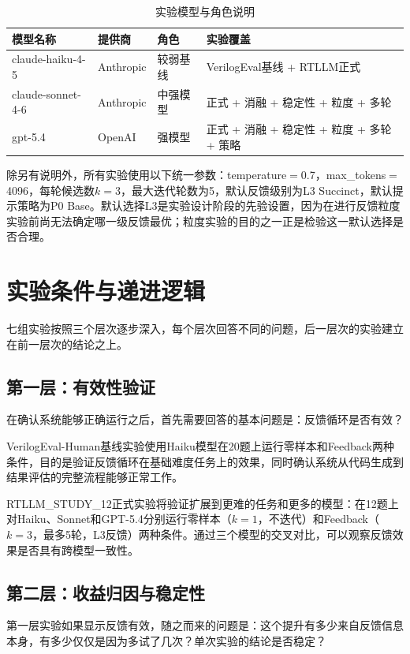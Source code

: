 \begin{table}[htbp]
\centering
\caption{实验模型与角色说明}
\label{tab:models}
\begin{tabular}{llll}
\toprule
模型名称 & 提供商 & 角色 & 实验覆盖 \\
\midrule
claude-haiku-4-5 & Anthropic & 较弱基线 & VerilogEval基线 + RTLLM正式 \\
claude-sonnet-4-6 & Anthropic & 中强模型 & 正式 + 消融 + 稳定性 + 粒度 + 多轮 \\
gpt-5.4 & OpenAI & 强模型 & 正式 + 消融 + 稳定性 + 粒度 + 多轮 + 策略 \\
\bottomrule
\end{tabular}
\end{table}

除另有说明外，所有实验使用以下统一参数：temperature$=$0.7，max\_tokens$=$4096，每轮候选数$k=3$，最大迭代轮数为5，默认反馈级别为L3 Succinct，默认提示策略为P0 Base。默认选择L3是实验设计阶段的先验设置，因为在进行反馈粒度实验前尚无法确定哪一级反馈最优；粒度实验的目的之一正是检验这一默认选择是否合理。

\section{实验条件与递进逻辑}

七组实验按照三个层次逐步深入，每个层次回答不同的问题，后一层次的实验建立在前一层次的结论之上。

\subsection{第一层：有效性验证}

在确认系统能够正确运行之后，首先需要回答的基本问题是：反馈循环是否有效？

VerilogEval-Human基线实验使用Haiku模型在20题上运行零样本和Feedback两种条件，目的是验证反馈循环在基础难度任务上的效果，同时确认系统从代码生成到结果评估的完整流程能够正常工作。

RTLLM\_STUDY\_12正式实验将验证扩展到更难的任务和更多的模型：在12题上对Haiku、Sonnet和GPT-5.4分别运行零样本（$k{=}1$，不迭代）和Feedback（$k{=}3$，最多5轮，L3反馈）两种条件。通过三个模型的交叉对比，可以观察反馈效果是否具有跨模型一致性。

\subsection{第二层：收益归因与稳定性}

第一层实验如果显示反馈有效，随之而来的问题是：这个提升有多少来自反馈信息本身，有多少仅仅是因为多试了几次？单次实验的结论是否稳定？


